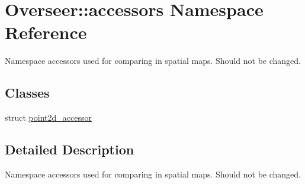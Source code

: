 \hypertarget{namespaceOverseer_1_1accessors}{}\section{Overseer\+:\+:accessors Namespace Reference}
\label{namespaceOverseer_1_1accessors}


Namespace accessors used for comparing in spatial maps. Should not be changed.  


\subsection*{Classes}
\begin{DoxyCompactItemize}
\item 
struct \hyperlink{structOverseer_1_1accessors_1_1point2d__accessor}{point2d\+\_\+accessor}
\end{DoxyCompactItemize}


\subsection{Detailed Description}
Namespace accessors used for comparing in spatial maps. Should not be changed. 
